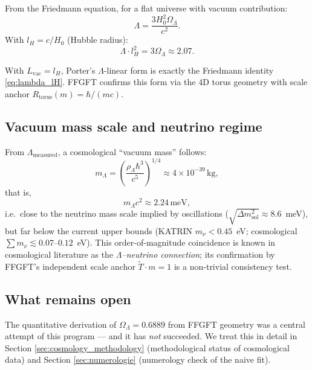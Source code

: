From the Friedmann equation, for a flat universe with vacuum contribution:
\begin{equation}
\Lambda = \frac{3 H_0^2 \Omega_\Lambda}{c^2}.
\end{equation}
With \(l_H = c/H_0\) (Hubble radius):
\begin{equation}
\Lambda \cdot l_H^2 = 3 \Omega_\Lambda \approx 2.07.
\label{eq:lambda_lH}
\end{equation}

\begin{keyresult}
With \(L_\text{vac} = l_H\), Porter's \(\Lambda\)-linear form is exactly the Friedmann identity \eqref{eq:lambda_lH}. FFGFT confirms this form via the 4D torus geometry with scale anchor \(R_\text{torus}(m) = \hbar/(mc)\).
\end{keyresult}

\subsection{Vacuum mass scale and neutrino regime}

From \(\Lambda_\text{measured}\), a cosmological ``vacuum mass'' follows:
\begin{equation}
m_\Lambda = \left(\frac{\rho_\Lambda \hbar^3}{c^5}\right)^{1/4} \approx 4 \times 10^{-39}\,\text{kg},
\end{equation}
that is,
\begin{equation}
m_\Lambda c^2 \approx 2.24\,\text{meV},
\end{equation}
i.e.\ close to the neutrino mass scale implied by oscillations ($\sqrt{\Delta m^2_{\text{sol}}} \approx 8.6$~meV), but far below the current upper bounds (KATRIN $m_\nu < 0.45$~eV; cosmological $\sum m_\nu \lesssim 0.07$--$0.12$~eV). This order-of-magnitude coincidence is known in cosmological literature as the \emph{$\Lambda$--neutrino connection}; its confirmation by FFGFT's independent scale anchor \(\tilde T \cdot m = 1\) is a non-trivial consistency test.

\subsection{What remains open}

The quantitative derivation of \(\Omega_\Lambda = 0.6889\) from FFGFT geometry was a central attempt of this program --- and it has \emph{not} succeeded. We treat this in detail in Section \ref{sec:cosmology_methodology} (methodological status of cosmological data) and Section \ref{sec:numerologie} (numerology check of the naive fit).

